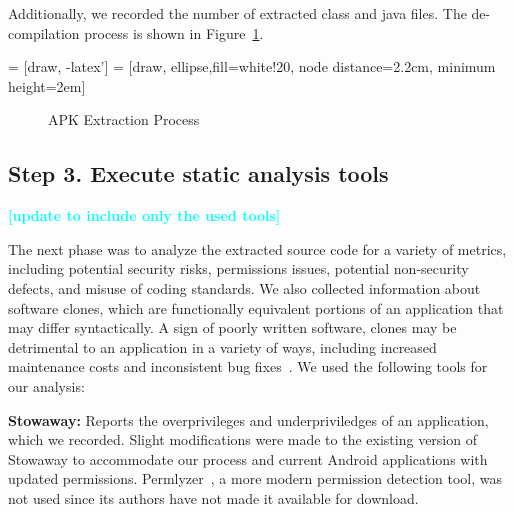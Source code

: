 \documentclass[conference]{IEEEtran}
\newcommand{\todo}[1]{\textcolor{cyan}{\textbf{[#1]}}}
\begin{document}
Additionally, we recorded the number of extracted class and java files. The de-compilation process is shown in Figure~\ref{fig:extractionprocess}.




 = [draw, -latex']
 = [draw, ellipse,fill=white!20, node distance=2.2cm,
    minimum height=2em]

	\begin{figure}[h]
	\begin{center}
\label{fig:extractionprocess}
\caption{APK Extraction Process}
\end{center}
\end{figure}


\subsection{Step 3. Execute static analysis tools}
\label{sec: analysis}

\todo{update to include only the used tools}

The next phase was to analyze the extracted source code for a variety of metrics, including potential security risks, permissions issues, potential non-security defects, and misuse of coding standards. We also collected information about software clones, which are functionally equivalent portions of an application that may differ syntactically. A sign of poorly written software, clones may be detrimental to an application in a variety of ways, including increased maintenance costs and inconsistent bug fixes~\cite{Roy:2009:CEC:1530898.1531101}. We used the following tools for our analysis:

 \textbf{Stowaway\cite{Felt:2011:APD:2046707.2046779}:} Reports the overprivileges and underpriviledges of an application, which we recorded. Slight modifications were made to the existing version of Stowaway to accommodate our process and current Android applications with updated permissions. Permlyzer~\cite{6698893}, a more modern permission detection tool, was not used since its authors have not made it available for download.
\end{document}
